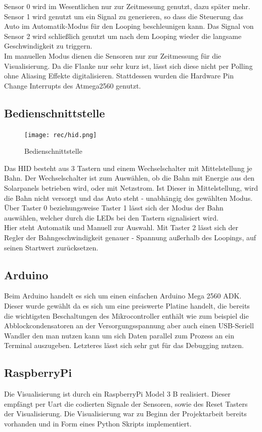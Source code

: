 \documentclass[a4paper, 11pt]{scrartcl}
\begin{document}
		Sensor 0 wird im Wesentlichen nur zur Zeitmessung genutzt, dazu später mehr.
		Sensor 1 wird genutzt um ein Signal zu generieren, so dass die Steuerung das Auto im Automatik-Modus für den Looping beschleunigen kann. 		Das Signal von Sensor 2 wird schließlich genutzt um nach dem Looping wieder die langsame Geschwindigkeit zu triggern.\\
		Im manuellen Modus dienen die Sensoren nur zur Zeitmessung für die Visualisierung.
		Da die Flanke nur sehr kurz ist, lässt sich diese nicht per Polling ohne Aliasing Effekte digitalisieren. Stattdessen wurden die Hardware 		Pin Change Interrupts des Atmega2560 genutzt.
	\subsection{Bedienschnittstelle}
		\begin{figure}[h]
			\centering
			\texttt{[image: rec/hid.png]}
			\caption{Bedienschnittstelle}
			\label{img:hid}
		\end{figure}
		Das HID besteht aus 3 Tastern und einem Wechselschalter mit Mittelstellung je Bahn.
		Der Wechselschalter ist zum Auswählen, ob die Bahn mit Energie aus den Solarpanels betrieben wird, oder mit Netzstrom. Ist Dieser in Mittelstellung, wird die Bahn nicht versorgt und das Auto steht - unabhängig des gewählten Modus.
		Über Taster 0 beziehungsweise Taster 1 lässt sich der Modus der Bahn auswählen, welcher durch die LEDs bei den Tastern signalisiert wird. \\Hier steht Automatik und Manuell zur Auswahl.
		Mit Taster 2 lässt sich der Regler der Bahngeschwindigkeit genauer -  Spannung außerhalb des Loopings, auf seinen Startwert zurücksetzen.
	\subsection{Arduino}
		Beim Arduino handelt es sich um einen einfachen Arduino Mega 2560 ADK.\\
		Dieser wurde gewählt da es sich um eine preiswerte Platine handelt, die bereits die wichtigsten Beschaltungen des Mikrocontroller enthält wie zum beispiel die Abblockcondensatoren an der Versorgungsspannung aber auch einen USB-Seriell Wandler den man nutzen kann um sich Daten parallel zum Prozess an ein Terminal auszugeben.
		Letzteres lässt sich sehr gut für das Debugging nutzen.
	\subsection{RaspberryPi}
		Die Visualisierung ist durch ein RaspberryPi Model 3 B realisiert. Dieser empfängt per Uart die codierten Signale der Sensoren, sowie des Reset Tasters der Visualisierung.
		Die Visualisierung war zu Beginn der Projektarbeit bereits vorhanden und in Form eines Python Skripts implementiert.
\end{document}
